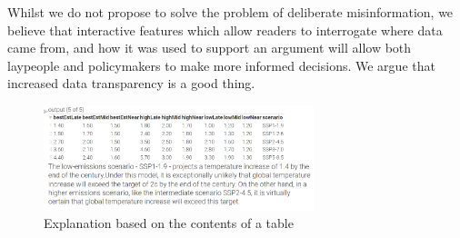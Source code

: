 Whilst we do not propose to solve the problem of deliberate misinformation, we believe
that interactive features which allow readers to interrogate where data came from, and how
it was used to support an argument will allow both laypeople and policymakers to make more
informed decisions. We argue that increased data transparency is a good thing.

\begin{figure}[h]
   \includegraphics[width=0.7\textwidth]{fig/ipcc-table-explanation.png}
   \caption{Explanation based on the contents of a table}
   \label{fig:table-explanation}
\end{figure}